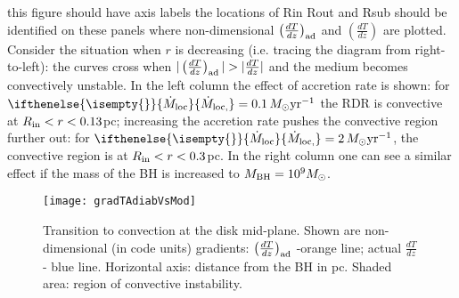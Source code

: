 \documentclass[12pt,english,preprint]{aastex}
\newcommand{\red}{\color{red}}
\newcommand{\su}[2]{#1_{\rm #2}}
\newcommand{\mdt}[1][]{ 
  \ifthenelse{\isempty{#1}}
  {\dot{M}_{\rm loc}}
  { {\dot M}_{\rm{loc},{#1}} } 
  } %
\newcommand{\Rin}{\su{R}{in}}
\newcommand{\MsolYrM}{ \,M_{\odot}{\rm yr}^{-1} }
\begin{document}
{\red this figure should have axis labels}
{\red the locations of Rin Rout and Rsub should be identified on these panels}
where non-dimensional
$\su{\left(\frac{dT}{dz}\right)}{ad}$ and $\left(\frac{dT}{dz}\right)$ are plotted. Consider the situation when $r$ is decreasing
(i.e. tracing the diagram from right-to-left): the curves cross when $\vert\su{\left(\frac{dT}{dz}\right)}{ad}\vert>\vert\frac{dT}{dz}\vert$ and 
the medium becomes convectively unstable. 
In the left column the effect of accretion rate is shown: for $\mdt=0.1\MsolYrM$ the RDR is convective at $\Rin<r<0.13$pc;
increasing the accretion rate pushes the convective region further out: for $\mdt=2\MsolYrM$, the convective region is at $\Rin<r<0.3$pc.
In the right column one can see a similar effect if the mass of the BH is increased to $\su{M}{BH}=10^9M_\odot$.

\begin{figure}
\texttt{[image: gradTAdiabVsMod]} 
\caption{Transition to convection at the disk mid-plane. Shown are non-dimensional
(in code units) gradients: $\left(\frac{dT}{dz}\right)_{{\rm ad}}$
-orange line; actual $\frac{dT}{dz}$ - blue line. Horizontal axis:
distance from the BH in pc. Shaded area: region of convective instability.}
\label{fig:ConvRegion}
\end{figure}








\end{document}
